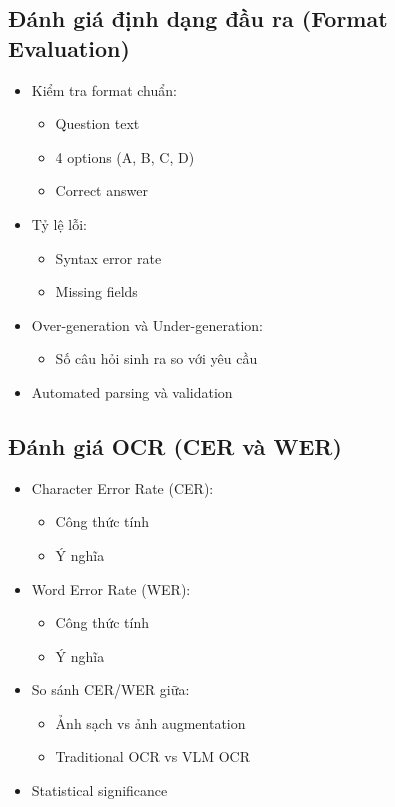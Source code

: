 \subsection{Đánh giá định dạng đầu ra (Format Evaluation)}
\begin{itemize}
    \item Kiểm tra format chuẩn:
    \begin{itemize}
        \item Question text
        \item 4 options (A, B, C, D)
        \item Correct answer
    \end{itemize}
    \item Tỷ lệ lỗi:
    \begin{itemize}
        \item Syntax error rate
        \item Missing fields
    \end{itemize}
    \item Over-generation và Under-generation:
    \begin{itemize}
        \item Số câu hỏi sinh ra so với yêu cầu
    \end{itemize}
    \item Automated parsing và validation
\end{itemize}

\subsection{Đánh giá OCR (CER và WER)}
\begin{itemize}
    \item Character Error Rate (CER):
    \begin{itemize}
        \item Công thức tính
        \item Ý nghĩa
    \end{itemize}
    \item Word Error Rate (WER):
    \begin{itemize}
        \item Công thức tính
        \item Ý nghĩa
    \end{itemize}
    \item So sánh CER/WER giữa:
    \begin{itemize}
        \item Ảnh sạch vs ảnh augmentation
        \item Traditional OCR vs VLM OCR
    \end{itemize}
    \item Statistical significance
\end{itemize}

